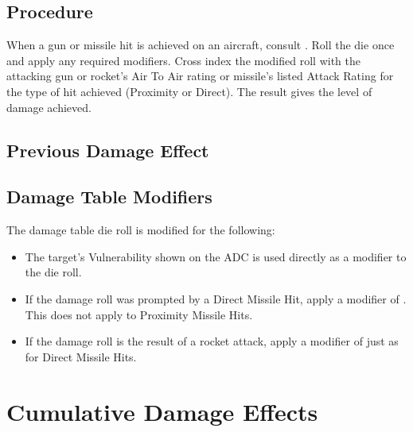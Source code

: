\subsection{Procedure} When a gun or missile hit is achieved on an aircraft, consult . Roll the die once and apply any required modifiers. Cross index the modified roll with the attacking gun or rocket's Air To Air rating or missile's listed Attack Rating for the type of hit achieved (Proximity or Direct). The result gives the level of damage achieved.

\subsection{Previous Damage Effect} 

\subsection{Damage Table Modifiers} The damage table die roll is modified for the following:

\begin{itemize}

    \item{} The target's Vulnerability shown on the ADC is used directly as a modifier to the die roll.

    \item{} If the damage roll was prompted by a Direct Missile Hit, apply a modifier of . This does not apply to Proximity Missile Hits.

    \item{} If the damage roll is the result of a rocket attack, apply a modifier of  just as for Direct Missile Hits.

\end{itemize}


\section{Cumulative Damage Effects}

